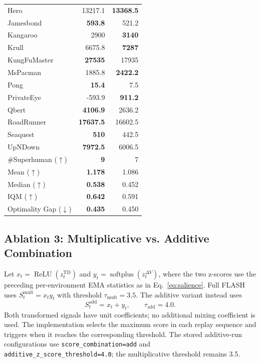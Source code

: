 \documentclass{article} %
\begin{document}
\begin{table}[!htbp]
\begin{tabular}{lrr}
Hero & 13217.1 & \textbf{13368.5} \\
Jamesbond & \textbf{593.8} & 521.2 \\
Kangaroo & 2900 & \textbf{3140} \\
Krull & 6675.8 & \textbf{7287} \\
KungFuMaster & \textbf{27535} & 17935 \\
MsPacman & 1885.8 & \textbf{2422.2} \\
Pong & \textbf{15.4} & 7.5 \\
PrivateEye & -593.9 & \textbf{911.2} \\
Qbert & \textbf{4106.9} & 2636.2 \\
RoadRunner & \textbf{17637.5} & 16602.5 \\
Seaquest & \textbf{510} & 442.5 \\
UpNDown & \textbf{7972.5} & 6006.5 \\
\midrule
\#Superhuman ($\uparrow$) & \textbf{9} & 7 \\
Mean ($\uparrow$) & \textbf{1.178} & 1.086 \\
Median ($\uparrow$) & \textbf{0.538} & 0.452 \\
IQM ($\uparrow$) & \textbf{0.642} & 0.591 \\
Optimality Gap ($\downarrow$) & \textbf{0.435} & 0.450 \\
\bottomrule
\end{tabular}
\end{table}
\FloatBarrier

\subsection{Ablation 3: Multiplicative vs. Additive Combination}

Let $x_t=\operatorname{ReLU}(z_t^{\mathrm{TD}})$ and $y_t=\operatorname{softplus}(z_t^{\Delta V})$, where the two z-scores use the preceding per-environment EMA statistics as in Eq.~\eqref{eq:salience}. Full FLASH uses $S_t^{\mathrm{mult}}=x_ty_t$ with threshold $\tau_{\mathrm{mult}}=3.5$. The additive variant instead uses
\begin{equation}
S_t^{\mathrm{add}}=x_t+y_t,\qquad \tau_{\mathrm{add}}=4.0.
\label{eq:appendix_additive_salience}
\end{equation}
Both transformed signals have unit coefficients; no additional mixing coefficient is used. The implementation selects the maximum score in each replay sequence and triggers when it reaches the corresponding threshold. The stored additive-run configurations use \texttt{score\_combination=add} and \texttt{additive\_z\_score\_threshold=4.0}; the multiplicative threshold remains 3.5.
\end{document}
